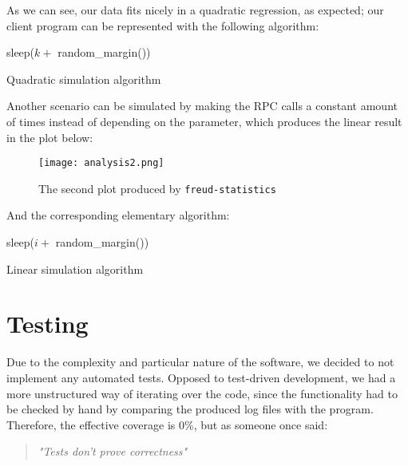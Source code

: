     As we can see, our data fits nicely in a quadratic regression, as expected;
    our client program can be represented with the following algorithm:

    \begin{algorithm}[H]
         {
             {
                 {
                    sleep($k + $ random\_margin())\;
                }
            }
        }
        \caption{Quadratic simulation algorithm}
    \end{algorithm}

    \vspace{5mm}

    Another scenario can be simulated by making the RPC calls a constant amount of times instead
    of depending on the parameter, which produces the linear result in the plot below:

    \begin{figure}[H]
        \centering
        \texttt{[image: analysis2.png]}
        \caption{The second plot produced by \texttt{freud-statistics}}
        \label{fig:analysis2}
    \end{figure}

    And the corresponding elementary algorithm:

    \begin{algorithm}[H]
        \SetAlgoLined
         {
             {
                sleep($i + $ random\_margin())\;
            }
        }
        \caption{Linear simulation algorithm}
    \end{algorithm}

    \vspace{5mm}


    \section{Testing}

        Due to the complexity and particular nature of the software, we decided to not implement any automated
        tests. Opposed to test-driven development, we had a more unstructured way of iterating over the code,
        since the functionality had to be checked by hand by comparing the produced log files with the program.
        Therefore, the effective coverage is 0\%, but as someone once said:

        \begin{quote} 
            \centering 
            \textit{"Tests don't prove correctness"}
        \end{quote}


